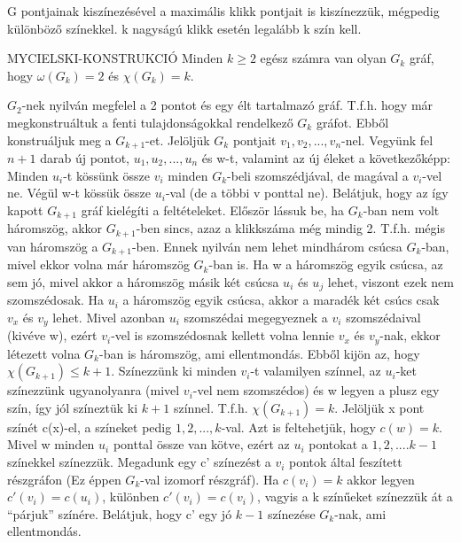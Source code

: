 \begin{bizonyitas}{}
G pontjainak kiszínezésével a maximális klikk pontjait is kiszínezzük, mégpedig különböző színekkel. k nagyságú klikk esetén legalább k szín kell.
\end{bizonyitas}

\begin{tetel}{MYCIELSKI-KONSTRUKCIÓ}
Minden $k \geq 2$ egész számra van olyan $G_k$ gráf, hogy $\omega(G_k) = 2$ és $\chi(G_k) = k$.
\end{tetel}

\begin{bizonyitas}{}
$G_2$-nek nyilván megfelel a 2 pontot és egy élt tartalmazó gráf. T.f.h. hogy már megkonstruáltuk a fenti tulajdonságokkal rendelkező $G_k$ gráfot. Ebből konstruáljuk meg a $G_{k+1}$-et. Jelöljük $G_k$ pontjait $v_1, v_2,..., v_n$-nel. Vegyünk fel $n + 1$ darab új pontot, $u_1, u_2,..., u_n$ és w-t, valamint az új éleket a következőképp: Minden $u_i$-t kössünk össze $v_i$ minden $G_k$-beli szomszédjával, de magával a $v_i$-vel ne. Végül w-t kössük össze $u_i$-val (de a többi v ponttal ne). Belátjuk, hogy az így kapott $G_{k+1}$ gráf kielégíti a feltételeket. Először lássuk be, ha $G_k$-ban nem volt háromszög, akkor $G_{k+1}$-ben sincs, azaz a klikkszáma még mindig 2. T.f.h. mégis van háromszög a $G_{k+1}$-ben. Ennek nyilván nem lehet mindhárom csúcsa $G_k$-ban, mivel ekkor volna már háromszög $G_k$-ban is. Ha w a háromszög egyik csúcsa, az sem jó, mivel akkor a háromszög másik két csúcsa $u_i$ és $u_j$ lehet, viszont ezek nem szomszédosak. Ha $u_i$ a háromszög egyik csúcsa, akkor a maradék két csúcs csak $v_x$ és $v_y$ lehet. Mivel azonban $u_i$ szomszédai megegyeznek a $v_i$ szomszédaival (kivéve w), ezért $v_i$-vel is szomszédosnak kellett volna lennie $v_x$ és $v_y$-nak, ekkor létezett volna $G_k$-ban is háromszög, ami ellentmondás. Ebből kijön az, hogy $\chi(G_{k+1}) \leq k + 1$. Színezzünk ki minden $v_i$-t valamilyen színnel, az $u_i$-ket színezzünk ugyanolyanra (mivel $v_i$-vel nem szomszédos) és w legyen a plusz egy szín, így jól színeztük ki $k+1$ színnel. T.f.h. $\chi(G_{k+1}) = k$. Jelöljük x pont színét c(x)-el, a színeket pedig $1, 2,..., k$-val. Azt is feltehetjük, hogy $c(w) = k$. Mivel w minden $u_i$ ponttal össze van kötve, ezért az $u_i$ pontokat a $1, 2,....k - 1$ színekkel színezzük. Megadunk egy c' színezést a $v_i$ pontok által feszített részgráfon (Ez éppen $G_k$-val izomorf részgráf). Ha $c(v_i) = k$ akkor legyen $c'(v_i) = c(u_i)$, különben $c'(v_i) = c(v_i)$, vagyis a k színűeket színezzük át a ``párjuk'' színére. Belátjuk, hogy c' egy jó $k-1$ színezése $G_k$-nak, ami ellentmondás.
\end{bizonyitas}

